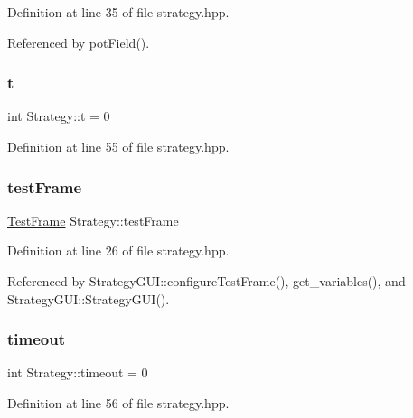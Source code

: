 Definition at line 35 of file strategy.\+hpp.



Referenced by pot\+Field().

\mbox{\label{class_strategy_aafc0c4eee86b328c4e73a4d207359cdb}} 
\subsubsection{\texorpdfstring{t}{t}}
{\footnotesize\ttfamily int Strategy\+::t = 0}



Definition at line 55 of file strategy.\+hpp.

\mbox{\label{class_strategy_a6fabfc409deb567f30bae2150cfbafad}} 
\subsubsection{\texorpdfstring{test\+Frame}{testFrame}}
{\footnotesize\ttfamily \hyperlink{class_test_frame}{Test\+Frame} Strategy\+::test\+Frame}



Definition at line 26 of file strategy.\+hpp.



Referenced by Strategy\+G\+U\+I\+::configure\+Test\+Frame(), get\+\_\+variables(), and Strategy\+G\+U\+I\+::\+Strategy\+G\+U\+I().

\mbox{\label{class_strategy_a3460ae971a33867028f507f655353b55}} 
\subsubsection{\texorpdfstring{timeout}{timeout}}
{\footnotesize\ttfamily int Strategy\+::timeout = 0}



Definition at line 56 of file strategy.\+hpp.

\mbox{\label{class_strategy_a5d821009839ab551e52df62c8c9fc2c0}} 
